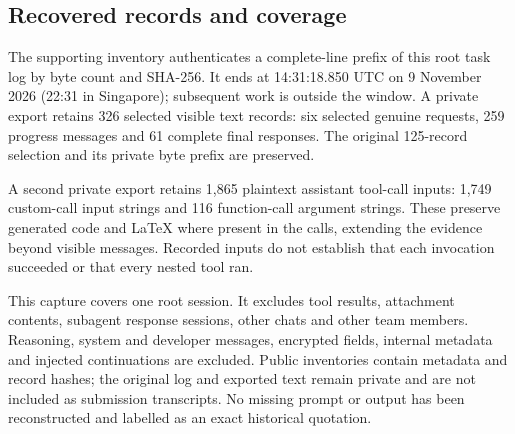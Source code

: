 \subsection*{Recovered records and coverage}
The supporting inventory authenticates a complete-line prefix of this root
task log by byte count and SHA-256. It ends at 14:31:18.850 UTC on
9 November 2026 (22:31 in Singapore); subsequent work is outside the window.
A private export retains 326 selected visible text records: six selected
genuine requests, 259 progress messages and 61 complete final responses.
The original 125-record selection and its private byte prefix are preserved.

A second private export retains 1,865 plaintext assistant tool-call inputs:
1,749 custom-call input strings and 116 function-call argument strings.
These preserve generated code and LaTeX where present in the calls, extending
the evidence beyond visible messages. Recorded inputs do not establish that
each invocation succeeded or that every nested tool ran.

This capture covers one root session. It excludes tool results, attachment
contents, subagent response sessions, other chats and other team members.
Reasoning, system and developer messages, encrypted fields, internal metadata
and injected continuations are excluded. Public inventories contain metadata
and record hashes; the original log and exported text remain private and are
not included as submission transcripts. No missing prompt or output has been
reconstructed and labelled as an exact historical quotation.
